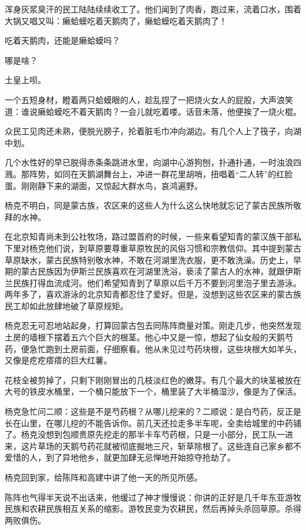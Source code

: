 \par 浑身灰浆臭汗的民工陆陆续续收工了。他们闻到了肉香，跑过来，流着口水，围着大锅又唱又叫：癞蛤蟆吃着天鹅肉了，癞蛤蟆吃着天鹅肉了！
\par 吃着天鹅肉，还能是癞蛤蟆吗？
\par 哪是啥？
\par 土皇上呗。
\par 一个五短身材，瞪着两只蛤蟆眼的人，趁乱捏了一把烧火女人的屁股，大声浪笑道：谁说癞蛤蟆吃不着天鹅肉？一会儿就吃着喽。话音未落，他便挨了一烧火棍。
\par 众民工见肉还未熟，便脱光膀子，抡着脏毛巾冲向湖边。有几个人上了筏子，向湖中划。
\par 几个水性好的早已脱得赤条条跳进水里，向湖中心游狗刨，扑通扑通，一时浊浪四溅。那阵势，如同在天鹅湖舞台上，冲进一群花里胡哨，扭唱着“二人转”的红脸蛋。刚刚静下来的湖面，又惊起大群水鸟，哀鸿遍野。
\par 杨克不明白，同是蒙古族，农区来的这些人为什么这么快地就忘记了蒙古民族所敬拜的水神。
\par 在北京知青尚未到公社牧场，路过盟首府的时候，一些来看望知青的蒙汉族干部私下里对杨克他们说，到草原要尊重草原牧民的风俗习惯和宗教信仰。其中提到蒙古草原缺水，蒙古民族特别敬水神，不敢在河湖里洗衣服，更不敢洗澡。历史上，早期的蒙古民族因为伊斯兰民族喜欢在河湖里洗浴，亵渎了蒙古人的水神，就跟伊斯兰民族打得血流成河。他们希望知青到了草原以后千万不要到河里泡子里去游泳。两年多了，喜欢游泳的北京知青都忍住了爱好。但是，没想到这些农区来的蒙古族民工却如此放肆地破了草原规矩。
\par 杨克忍无可忍地站起身，打算回蒙古包去同陈阵商量对策。刚走几步，他突然发现土房的墙根下摆着五六个巨大的根茎。他心中又是一惊，想起了仙女般的天鹅芍药，便急忙跑到土房前面，仔细察看。他从未见过芍药块根，这些块根大如羊头，又像是疙疙瘩瘩的巨大红薯。
\par 花枝全被剪掉了，只剩下刚刚冒出的几枝淡红色的嫩芽。有几个最大的块茎被放在大号的铁皮水桶里，一个桶只能放下一个，桶里装了大半桶湿沙，像是为了保活。
\par 杨克急忙问二顺：这些是不是芍药根？从哪儿挖来的？二顺说：是白芍药，反正是长在山里，在哪儿挖的不能告诉你。前几天还拉走多半车呢，全卖给城里的中药铺了。杨克没想到包顺贵原先挖走的那半卡车芍药根，只是一小部分，民工队一进来，这片草场的天鹅芍药花就被彻底掘地三尺，斩草除根了。这些连自己家乡都不爱惜的人，到了异地他乡，就更加肆无忌惮地开始掠夺抢劫了。
\par 杨克回到家，给陈阵和高建中讲了他一天的所见所感。
\par 陈阵也气得半天说不出话来，他缓过了神才慢慢说：你讲的正好是几千年东亚游牧民族和农耕民族相互关系的缩影。游牧民变为农耕民，然后再掉头杀回草原。杀得两败俱伤。
